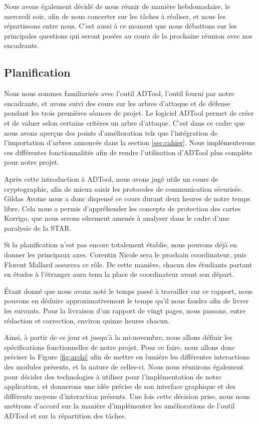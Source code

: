	    Nous avons également décidé de nous réunir de manière hebdomadaire, le mercredi soir, afin de nous concerter sur les tâches à réaliser, et nous les répartissons entre nous. C'est aussi à ce moment que nous débattons sur les principales questions qui seront posées au cours de la prochaine réunion avec nos encadrants.

	    
				\subsection{Planification}
		Nous nous sommes familiarisés avec l'outil ADTool, l'outil fourni par notre encadrante, et avons suivi des cours sur les arbres d'attaque et de défense pendant les trois premières séances de projet. Le logiciel ADTool permet de créer et de valuer selon certains critères un arbre d'attaque. C'est dans ce cadre que nous avons aperçus des points d'amélioration tels que l'intégration de l'importation d'arbres annoncée dans la section \ref{sec:cahier}. Nous implémenterons ces différentes fonctionnalités afin de rendre l'utilisation d'ADTool plus complète pour notre projet.
	    
	    Après cette introduction à ADTool, nous avons jugé utile un cours de cryptographie, afin de mieux saisir les protocoles de communication sécurisée. Gildas Avoine nous a donc dispensé ce cours durant deux heures de notre temps libre. Cela nous a permis d'appréhender les concepts de protection des cartes Korrigo, que nous serons sûrement amenés à analyser dans le cadre d'une paralysie de la STAR.
			
		Si la planification n'est pas encore totalement établie, nous pouvons déjà en donner les principaux axes.
		Corentin Nicole sera le prochain coordinateur, puis Florent Mallard assurera ce rôle. De cette manière, chacun des étudiants partant en études à l'étranger aura tenu la place de coordinateur avant son départ.

		Étant donné que nous avons noté le temps passé à travailler sur ce rapport, nous pouvons en déduire approximativement le temps qu'il nous faudra afin de livrer les suivants. Pour la livraison d'un rapport de vingt pages, nous passons, entre rédaction et correction, environ quinze heures chacun.

		Ainsi, à partir de ce jour et jusqu'à la mi-novembre, nous allons définir les spécifications fonctionnelles de notre projet.
		Pour ce faire, nous allons donc préciser la Figure \ref{fig:archi} afin de mettre en lumière les différentes interactions des modules présents, et la nature de celles-ci. Nous nous réunirons également pour décider des technologies à utiliser pour l'implémentation de notre application, et donnerons une idée précise de son interface graphique et des différents moyens d'interaction présents.
		Une fois cette décision prise, nous nous mettrons d'accord sur la manière d'implémenter les améliorations de l'outil ADTool et sur la répartition des tâches.

